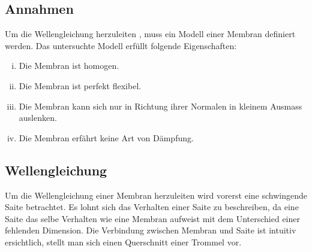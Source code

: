\subsection{Annahmen} 
Um die Wellengleichung herzuleiten \cite{kreismembran:wellengleichung_herleitung}, muss ein Modell einer Membran definiert werden. 
Das untersuchte Modell erfüllt folgende Eigenschaften:
\begin{enumerate}[i)]
	\item Die Membran ist homogen. 
	\item Die Membran ist perfekt flexibel. 
	\item Die Membran kann sich nur in Richtung ihrer Normalen in kleinem Ausmass auslenken.
	\item Die Membran erfährt keine Art von Dämpfung. 
	
\end{enumerate}

\subsection{Wellengleichung} Um die Wellengleichung einer Membran herzuleiten wird vorerst eine schwingende Saite betrachtet.
Es lohnt sich das Verhalten einer Saite zu beschreiben, da eine Saite das selbe Verhalten wie eine Membran aufweist mit dem Unterschied einer fehlenden Dimension.
Die Verbindung zwischen Membran und Saite ist intuitiv ersichtlich, stellt man sich einen Querschnitt einer Trommel vor.



